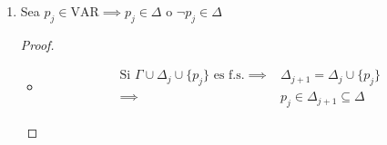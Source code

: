 \begin{itemize}[align=right]
\begin{enumerate}
\begin{proof}
            \begin{itemize}
                \item CB) $n = 0$

                    \begin{gather*}
                         \Gamma \cup \Delta_0 = \Gamma \text{ es f.s.}
                         \notamath{Dato}
                    \end{gather*}
                \item HI) $\Gamma \cup \Delta_n$ es f.s.
                \item T) $\Gamma \cup \Delta_{n+1}$ es f.s.
            \end{itemize}

            \begin{align*}
                 \Gamma \cup \Delta_{n+1} =
                 \begin{cases}
                     \Gamma \cup \Delta_n \cup \{ p_n \} & \text{si } 
                     \underbrace{\Gamma \cup \Delta_n}_{\substack{
                     \text{Por HI}\\\text{es f.s.}}} 
                     \cup \{ p_n \} \text{ es f.s.}\\
                     \Gamma \cup \Delta_n \cup \{ \neg p_n \} & \text{sino}
                 \end{cases} \\
            \end{align*}

            Utilizando el Lema \ref{lema:gamma-pi-no-pi-esfs}:

            Si $\Gamma \cup \Delta_n \cup \{ p_j \}$ es f.s. 
            $\implies \Gamma \cup \Delta_{n+1} 
            = \Gamma \cup \Delta_n \cup \{ p_n \}$ es f.s.

            Si $\Gamma \cup \Delta_n \cup \{ \neg p_j \}$ es f.s. 
            $\implies \Gamma \cup \Delta_{n+1} 
            = \Gamma \cup \Delta_n \cup \{ \neg p_n \}$ es f.s.

            \end{proof}

            \item Sea $p_j \in \mathrm{VAR} \implies p_j \in \Delta$ o 
                $\neg p_j \in \Delta$

            \begin{proof} \phantom{.}
            
            \begin{itemize}
                \item \begin{align*}
                \text{Si } \Gamma \cup \Delta_j \cup \{ p_j \}
                \text{ es f.s.} \implies& \Delta_{j+1} 
                = \Delta_j \cup \{ p_j \} \\
                \implies& p_j \in \Delta_{j+1} \subseteq \Delta
            \end{align*}


\end{itemize}
\end{proof}
\end{enumerate}
\end{itemize}
